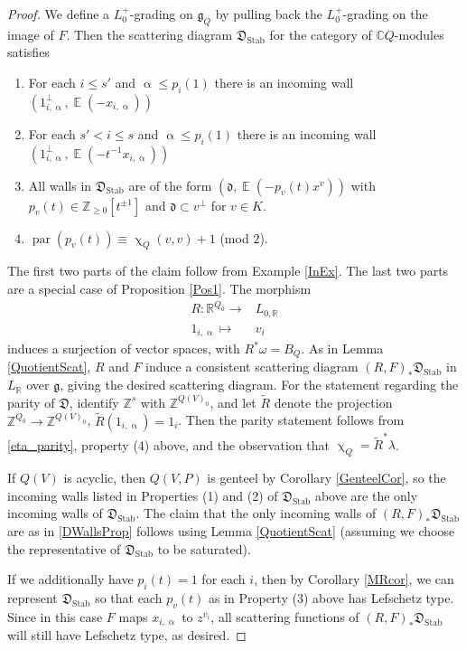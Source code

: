\documentclass{amsart}
\DeclareMathOperator{\parit}{par}
\DeclareMathOperator{\EE}{\mathbb{E}}
\DeclareMathOperator{\Stab}{Stab}
\let\bb=\mathbb
\let\rar=\rightarrow
\let\f=\mathfrak
\let\wt=\widetilde
\newcommand{\g}[1]{1_{#1}}
\renewcommand{\alpha}{\upalpha}
\renewcommand{\chi}{\upchi}
\theoremstyle{plain}%
\theoremstyle{definition}
\theoremstyle{remark}
\begin{document}
\begin{proof}
We define a $L_0^{+}$-grading on $\f{g}_Q$ by pulling back the $L_0^{+}$-grading on the image of $F$.  Then the scattering diagram $\f{D}_{\Stab}$ for the category of $\mathbb{C}Q$-modules satisfies
\begin{enumerate}
    \item For each $i\leq s'$ and $\alpha\leq p_i(1)$ there is an incoming wall $(\g{i,\alpha}^{\perp},\EE(-x_{i,\alpha}))$ \item
    For each $s'<i\leq s$ and $\alpha\leq p_i(1)$ there is an incoming wall $(\g{i,\alpha}^{\perp},\EE(-t^{-1}x_{i,\alpha}))$
    \item
    All walls in $\f{D}_{\Stab}$ are of the form $(\f{d},\EE(-p_v(t)x^v))$ with $p_v(t)\in\bb{Z}_{\geq 0}[t^{\pm 1}]$ and $\f{d}\subset v^{\perp}$ for $v\in K$. 
    \item
    $\parit(p_v(t))\equiv \chi_Q(v,v)+1$ (mod $2$).
\end{enumerate}
The first two parts of the claim follow from Example \ref{InEx}.  The last two parts are a special case of Proposition \ref{Pos1}.  The morphism
\begin{align*}
    R\colon \mathbb{R}^{Q_0}\rightarrow &L_{0,\mathbb{R}}\\
    \g{i,\alpha}\mapsto &v_i
\end{align*}
induces a surjection of vector spaces, with $R^*\omega=B_Q$.  As in Lemma \ref{QuotientScat}, $R$ and $F$ induce a consistent scattering diagram $(R,F)_*\f{D}_{\Stab}$ in $L_{\bb{R}}$ over $\f{g}$, giving the desired scattering diagram.  For the statement regarding the parity of $\f{D}$, identify $\bb{Z}^s$ with $\bb{Z}^{Q(V)_0}$, and let $\wt{R}$ denote the projection $\bb{Z}^{Q_0}\rar \bb{Z}^{Q(V)_0}$, $\wt{R}(1_{i,\alpha})=1_i$.  Then the parity statement follows from \eqref{eta_parity}, property (4) above, and the observation that $\chi_Q=\wt{R}^*\lambda$.

If $Q(V)$ is acyclic, then $Q(V,P)$ is genteel by Corollary \ref{GenteelCor}, so the incoming walls listed in Properties (1) and (2) of $\f{D}_{\Stab}$ above are the only incoming walls of $\f{D}_{\Stab}$.  The claim that the only incoming walls of $(R,F)_*\f{D}_{\Stab}$ are as in \eqref{DWallsProp} follows using Lemma \ref{QuotientScat} (assuming we choose the representative of $\f{D}_{\Stab}$ to be saturated).

If we additionally have $p_i(t)=1$ for each $i$, then by Corollary \ref{MRcor}, we can represent $\f{D}_{\Stab}$ so that each $p_v(t)$ as in Property (3) above has Lefschetz type.  Since in this case $F$ maps $x_{i,\alpha}$ to $z^{v_i}$, all scattering functions of $(R,F)_*\f{D}_{\Stab}$ will still have Lefschetz type, as desired. 
\end{proof}
\end{document}
